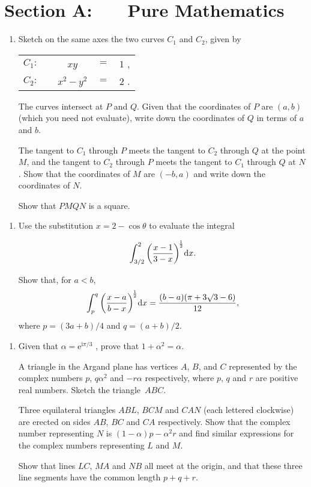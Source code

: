 \documentclass[a4, 11pt]{report}
\newlength{\qspace}
\newcounter{qnumber}
\newenvironment{question}%
 {\vspace{\qspace}
  \begin{enumerate}[\bfseries 1\quad][10]%
    \setcounter{enumi}{\value{qnumber}}%
    \item%
 }
{
  \end{enumerate}
  \filbreak
  \stepcounter{qnumber}
 }
\def\d{{\mathrm d}}
\def\e{{\mathrm e}}
\begin{document}
\setcounter{page}{2}

 
\section*{Section A: \ \ \ Pure Mathematics}

\begin{question}
 Sketch on the same axes the two curves $C_1$ and $C_2$, given by 
\begin{center} 
\begin{tabular}{cccc} 
$C_1:$ & \ \ $ x y$ & $=$ & $1$ ,\\   
$C_2:$ & \ \ $x^2-y^2$ & $=$ &  $2$ . 
\end{tabular} 
\end{center} 
The curves 
intersect at $P$ and $Q$. Given that   
 the coordinates of $P$ are $(a,b)$ (which you need not evaluate), 
write down the coordinates of $Q$ in terms of $a$ and $b$. 
 
The tangent to $C_1$ through  $P$ meets the tangent to $C_2$ 
through $Q$ at the point $M$, and the tangent to $C_2$ through $P$ meets the  
tangent to $C_1$ through $Q$ at $N$. Show that the coordinates of $M$ are 
$(-b,a)$ 
and write down the coordinates of $N$. 
 
Show that $PMQN$ is a square. 
\end{question}

\begin{question}
Use the substitution   
$x = 2-\cos \theta $   
to evaluate the integral 
 
$$ 
\int_{3/2}^2 \left(x -  1 \over 3 - x\right)^{\!\frac12}\! \d x.  
$$  
 
Show that, for $a<b$, 
$$ 
\int_p^q \left( x -  a \over b - x\right)^{\!\frac12} \!\d x = 
\frac{(b-a)(\pi +3{\surd3}  -6)}{12},  
$$  
where $p=  {(3a+b)/4}$ and $q={(a+b)/2}$. 
\end{question}

\begin{question}
Given that $\alpha = \e^{\mathrm{i} \pi/3}$ ,  
prove that  $1 + \alpha^2 = \alpha$. 
 
A triangle in the Argand plane has vertices $A$, $B$, and $C$ 
 represented by the complex numbers  
$p$, $q\alpha^2$ and $- r\alpha$   
respectively, where  $p$, $q$ and $r$  
are positive real numbers. Sketch the triangle~$ABC$. 
 
Three equilateral triangles $ABL$, $BCM$ and $CAN$ 
(each lettered clockwise) 
 are erected on sides $AB$, $BC$ and $CA$ respectively.  
Show that the complex number representing $N$ is  
\mbox{$( 1 - \alpha) p- \alpha^2 r$}   
and find similar expressions for the  
complex numbers representing $L$ and $M$. 
 
Show that lines $LC$, $MA$ and $NB$ all meet at the origin,  
and that these three line segments have the  
common length  $p+q+r$. 
\end{question}
\end{document}
